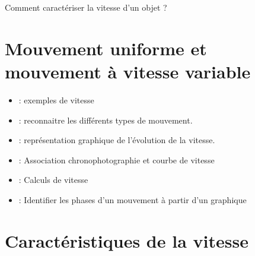 \documentclass[12pt,a4paper]{article}
\date{}
\title{}
\begin{document}
	
\graphicspath{{./img/}}	



\begin{mypb}
	\begin{center}
		{\Large Comment caractériser la vitesse d'un objet ?}
	\end{center}
\end{mypb}


\section{Mouvement uniforme et mouvement à vitesse variable}








\begin{myexos}
	\begin{itemize}
		\item {}  : exemples de vitesse
		\item {}  : reconnaitre les différents types de mouvement.
		\item {}  : représentation graphique de l'évolution de la vitesse.
		\item {}  : Association chronophotographie et courbe de vitesse
		\item {}  : Calculs de vitesse
		\item {} : Identifier les phases d'un mouvement à partir d'un graphique
	\end{itemize}
\end{myexos}

\section{Caractéristiques de la vitesse}







\begin{myexos}
	
\end{myexos}




\appendix

\end{document}
